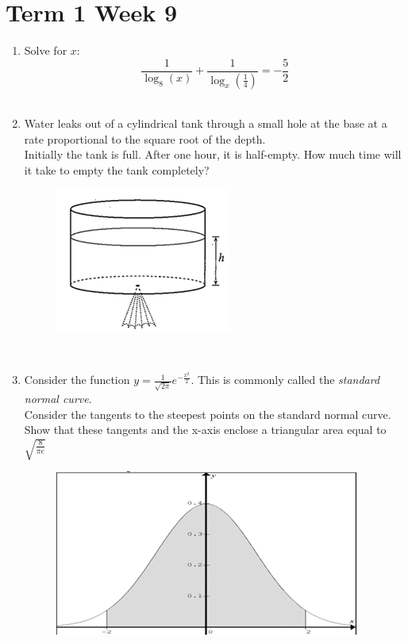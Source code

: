 \documentclass[../main.tex]{subfiles}
\begin{document}
\section*{Term 1 Week 9}
\begin{enumerate}
    \item 
    Solve for \(x\):\\
    \[\frac{1}{\log_8(x)}+\frac{1}{\log_x(\frac{1}{4})}=-\frac{5}{2}\]\\

    \item 
    Water leaks out of a cylindrical tank through a small hole at the base at a rate proportional to the square root of the depth.\\
    
    Initially the tank is full. After one hour, it is half-empty. How much time will it take to empty the tank completely?\\
    \begin{figure}[h]
        \centering
        \includegraphics{images/t1w9q2.png}
    \end{figure}\\

    \item 
    Consider the function \(y=\frac{1}{\sqrt{2\pi}}e^{-\frac{x^2}{2}}\). This is commonly called the \textit{standard normal curve}.\\

    Consider the tangents to the steepest points on the standard normal curve.\\
    
    Show that these tangents and the x-axis enclose a triangular area equal to \(\sqrt{\frac{8}{\pi e}}\)
    \begin{figure}[h]
        \centering
        \includegraphics[width=0.5\linewidth]{images/t1w9q3.png}
    \end{figure}
    
\end{enumerate}
\end{document}
